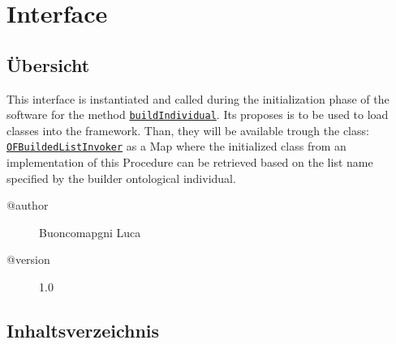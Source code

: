 
\section[OFBuilderInterface]{Interface }\label{ontologyFramework.OFRunning.OFInitialising.OFBuilderInterface<T>-class}
\subsection{Übersicht}
This interface is instantiated and called during the initialization phase of the software
 for the method \texttt{\hyperlink{ontologyFramework.OFRunning.OFInitialising.OFInitialiser.buildIndividual(org.semanticweb.owlapi.model.OWLNamedIndividual,ontologyFramework.OFContextManagement.OWLReferences)}{buildIndividual}}.
 Its proposes is to be used to load classes into the framework.
 Than, they will be available trough the class: \texttt{\hyperlink{ontologyFramework.OFRunning.OFInvokingManager.OFBuildedListInvoker-class}{OFBuildedListInvoker}} 
 as a Map where the initialized class from an implementation of this Procedure can be retrieved
 based on the list name specified by the builder ontological individual.
\begin{description}
\item[@author] 
Buoncomapgni Luca
\item[@version] 
1.0
\end{description}
\subsection{Inhaltsverzeichnis}
